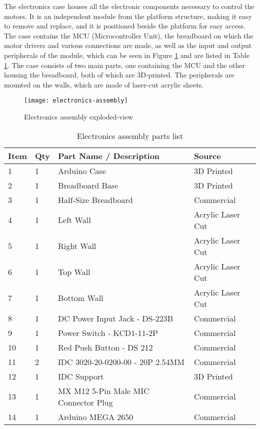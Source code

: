 The electronics case houses all the electronic components necessary to control the motors. It is an independent module from the platform structure, making it easy to remove and replace, and it is positioned beside the platform for easy access. The case contains the MCU (Microcontroller Unit), the breadboard on which the motor drivers and various connections are made, as well as the input and output peripherals of the module, which can be seen in Figure \ref{fig:electronics-assembly} and are listed in Table \ref{tab:electronics-assembly}. The case consists of two main parts, one containing the MCU and the other housing the breadboard, both of which are 3D-printed. The peripherals are mounted on the walls, which are made of laser-cut acrylic sheets.

\begin{figure}[H]
    \centering
    \texttt{[image: electronics-assembly]}
    \caption{Electronics assembly exploded-view}
    \label{fig:electronics-assembly}
\end{figure}

\begin{table}[h]
    \centering
    \caption{Electronics assembly parts list}
    \label{tab:electronics-assembly}
    \begin{tabular}{llll}
    \toprule
    Item & Qty & Part Name / Description & Source \\
    \midrule
    1 & 1 & Arduino Case & 3D Printed \\
    2 & 1 & Breadboard Base & 3D Printed \\
    3 & 1 & Half-Size Breadboard & Commercial \\
    4 & 1 & Left Wall & Acrylic Laser Cut \\
    5 & 1 & Right Wall & Acrylic Laser Cut \\
    6 & 1 & Top Wall & Acrylic Laser Cut \\
    7 & 1 & Bottom Wall & Acrylic Laser Cut \\
    8 & 1 & DC Power Input Jack - DS-223B & Commercial \\
    9 & 1 & Power Switch - KCD1-11-2P & Commercial \\
    10 & 1 & Red Push Button - DS 212 & Commercial \\
    11 & 2 & IDC 3020-20-0200-00 - 20P 2.54MM & Commercial \\
    12 & 1 & IDC Support & 3D Printed \\
    13 & 1 & MX M12 5-Pin Male MIC Connector Plug & Commercial \\
    14 & 1 & Arduino MEGA 2650 & Commercial \\
    \bottomrule
    \end{tabular}
\end{table}

